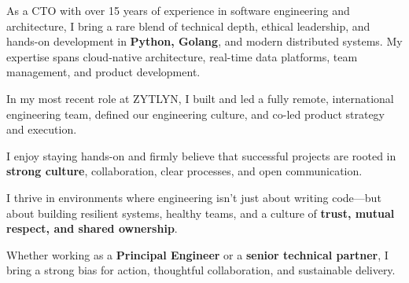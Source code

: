 

\begin{cvparagraph}

As a CTO with over 15 years of experience in software engineering and architecture, I bring a rare blend of technical depth, ethical leadership, and hands-on development in \textbf{Python, Golang}, and modern distributed systems.
My expertise spans cloud-native architecture, real-time data platforms, team management, and product development.

In my most recent role at ZYTLYN, I built and led a fully remote, international engineering team, defined our engineering culture, and co-led product strategy and execution.

I enjoy staying hands-on and firmly believe that successful projects are rooted in \textbf{strong culture}, collaboration, clear processes, and open communication.

I thrive in environments where engineering isn’t just about writing code—but about building resilient systems, healthy teams, and a culture of \textbf{trust, mutual respect, and shared ownership}.

Whether working as a \textbf{Principal Engineer} or a \textbf{senior technical partner}, I bring a strong bias for action, thoughtful collaboration, and sustainable delivery.
\end{cvparagraph}
